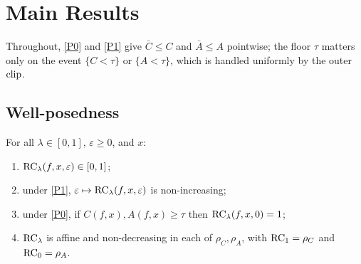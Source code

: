 \section{Main Results}
\label{sec:results}

Throughout, \ref{P0} and \ref{P1} give $\bar C\le C$ and $\bar A\le A$ pointwise;
the floor $\tau$ matters only on the event $\{C<\tau\}$ or $\{A<\tau\}$, which is
handled uniformly by the outer $\mathrm{clip}$.

\subsection{Well-posedness}

\begin{theorem}\label{thm:wellposed}
For all $\lambda\in[0,1]$, $\varepsilon\ge0$, and $x$:
\begin{enumerate}[label=\textup{(\alph*)},leftmargin=*]
  \item $\mathrm{RC}_\lambda(f,x,\varepsilon)\in[0,1]$;
  \item under \ref{P1}, $\varepsilon\mapsto\mathrm{RC}_\lambda(f,x,\varepsilon)$ is
  non-increasing;
  \item under \ref{P0}, if $C(f,x),A(f,x)\ge\tau$ then
  $\mathrm{RC}_\lambda(f,x,0)=1$;
  \item $\mathrm{RC}_\lambda$ is affine and non-decreasing in each of $\rho_C,\rho_A$, with
  $\mathrm{RC}_1=\rho_C$ and $\mathrm{RC}_0=\rho_A$.
\end{enumerate}
\end{theorem}

